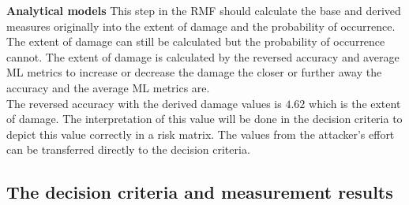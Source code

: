 \noindent\textbf{Analytical models} This step in the RMF should calculate the base and derived measures originally into the extent of damage and the probability of occurrence. The extent of damage can still be calculated but the probability of occurrence cannot. The extent of damage is calculated by the reversed accuracy and average ML metrics to increase or decrease the damage the closer or further away the accuracy and the average ML metrics are. \\
The reversed accuracy with the derived damage values is $4.62$ which is the extent of damage. The interpretation of this value will be done in the decision criteria to depict this value correctly in a risk matrix. The values from the attacker's effort can be transferred directly to the decision criteria.

\subsection{The decision criteria and measurement results}


